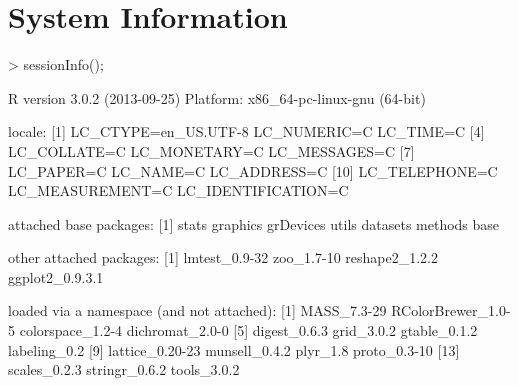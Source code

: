 \documentclass{article}
\begin{document}
\section{System Information}

\begin{Schunk}
\begin{Sinput}
> sessionInfo();
\end{Sinput}
\begin{Soutput}
R version 3.0.2 (2013-09-25)
Platform: x86_64-pc-linux-gnu (64-bit)

locale:
 [1] LC_CTYPE=en_US.UTF-8 LC_NUMERIC=C         LC_TIME=C           
 [4] LC_COLLATE=C         LC_MONETARY=C        LC_MESSAGES=C       
 [7] LC_PAPER=C           LC_NAME=C            LC_ADDRESS=C        
[10] LC_TELEPHONE=C       LC_MEASUREMENT=C     LC_IDENTIFICATION=C 

attached base packages:
[1] stats     graphics  grDevices utils     datasets  methods   base     

other attached packages:
[1] lmtest_0.9-32   zoo_1.7-10      reshape2_1.2.2  ggplot2_0.9.3.1

loaded via a namespace (and not attached):
 [1] MASS_7.3-29        RColorBrewer_1.0-5 colorspace_1.2-4   dichromat_2.0-0   
 [5] digest_0.6.3       grid_3.0.2         gtable_0.1.2       labeling_0.2      
 [9] lattice_0.20-23    munsell_0.4.2      plyr_1.8           proto_0.3-10      
[13] scales_0.2.3       stringr_0.6.2      tools_3.0.2       
\end{Soutput}
\end{Schunk}
\end{document}
